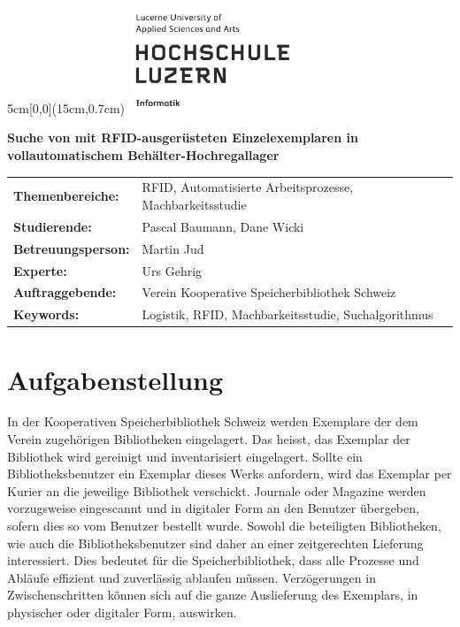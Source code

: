 \documentclass[
	a4paper
]{scrartcl}
\begin{document}

\begin{textblock*}{5cm}[0,0](15cm,0.7cm)
	\includegraphics[keepaspectratio,width=5cm]{img/HSLU_Logo}
\end{textblock*}

\vspace*{2cm}

\noindent
\textbf{\LARGE{Suche von mit RFID-ausgerüsteten Einzelexemplaren in vollautomatischem
Behälter-Hochregallager}} \\

\vspace{0.5em}

\bgroup
\setlength\tabcolsep{0cm}

\begin{large}
\noindent
\begin{tabularx}{\textwidth}{p{5cm}X}
	\textbf{Themenbereiche:} & RFID, Automatisierte Arbeitsprozesse, Machbarkeitsstudie\\
	\textbf{Studierende:} & Pascal Baumann, Dane Wicki\\
	\textbf{Betreuungsperson:} & Martin Jud\\
	\textbf{Experte:} & Urs Gehrig\\
	\textbf{Auftraggebende:} & Verein Kooperative Speicherbibliothek Schweiz\\
	\textbf{Keywords:} & Logistik, RFID, Machbarkeitsstudie, Suchalgorithmus\\
\end{tabularx}
\end{large}
\egroup

\section{Aufgabenstellung}
In der Kooperativen Speicherbibliothek Schweiz werden Exemplare der dem Verein zugehörigen Bibliotheken eingelagert. Das heisst, das Exemplar der Bibliothek wird gereinigt und inventarisiert eingelagert. Sollte ein Bibliotheksbenutzer ein Exemplar dieses Werks anfordern, wird das Exemplar per Kurier an die jeweilige Bibliothek verschickt. Journale oder Magazine werden vorzugsweise eingescannt und in digitaler Form an den Benutzer übergeben, sofern dies so vom Benutzer bestellt wurde. Sowohl die beteiligten Bibliotheken, wie auch die Bibliotheksbenutzer sind daher an einer zeitgerechten Lieferung interessiert. Dies bedeutet für die Speicherbibliothek, dass alle Prozesse und Abläufe effizient und zuverlässig ablaufen müssen. Verzögerungen in Zwischenschritten können sich auf die ganze Auslieferung des Exemplars, in physischer oder digitaler Form, auswirken.
\end{document}
